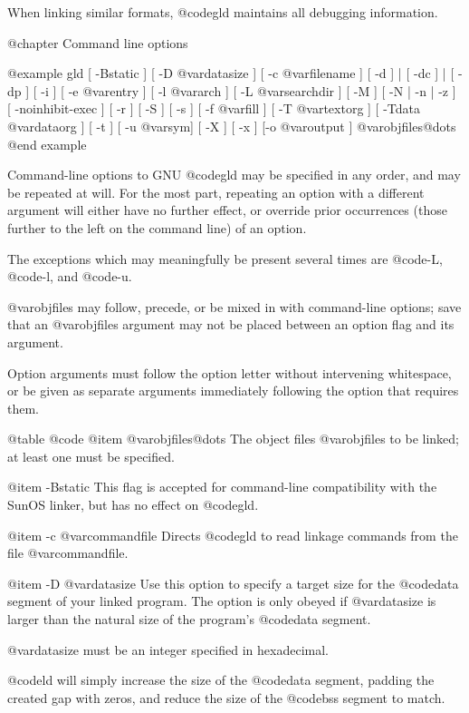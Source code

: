 When linking similar formats, @code{gld} maintains all debugging
information. 

@chapter Command line options

@example
  gld [ -Bstatic ]  [ -D @var{datasize} ] 
      [ -c @var{filename} ]
      [ -d ]  | [ -dc ] | [ -dp ]
      [ -i ]
      [ -e @var{entry} ]  [ -l @var{arch} ]  [ -L @var{searchdir} ]  [ -M ]  
      [ -N | -n | -z ]  [ -noinhibit-exec ]  [ -r ]  [ -S ]  [ -s ]  
      [ -f @var{fill} ]
      [ -T @var{textorg} ]  [ -Tdata @var{dataorg} ]  [ -t ]  [ -u @var{sym}]
      [ -X ]  [ -x ] 
      [-o @var{output} ] @var{objfiles}@dots{}
@end example

Command-line options to GNU @code{gld} may be specified in any order, and
may be repeated at will.  For the most part, repeating an option with a
different argument will either have no further effect, or override prior
occurrences (those further to the left on the command line) of an
option.  

The exceptions which may meaningfully be present several times
are @code{-L}, @code{-l}, and @code{-u}.

@var{objfiles} may follow, precede, or be mixed in with
command-line options; save that an @var{objfiles} argument may not be
placed between an option flag and its argument.

Option arguments must follow the option letter without intervening
whitespace, or be given as separate arguments immediately following the
option that requires them.

@table @code
@item @var{objfiles}@dots{}
The object files @var{objfiles} to be linked; at least one must be specified.

@item -Bstatic 
This flag is accepted for command-line compatibility with the SunOS linker,
but has no effect on @code{gld}.

@item -c @var{commandfile}
Directs @code{gld} to read linkage commands from the file @var{commandfile}.

@item -D @var{datasize}
Use this option to specify a target size for the @code{data} segment of
your linked program.  The option is only obeyed if @var{datasize} is
larger than the natural size of the program's @code{data} segment.

@var{datasize} must be an integer specified in hexadecimal.

@code{ld} will simply increase the size of the @code{data} segment,
padding the created gap with zeros, and reduce the size of the
@code{bss} segment to match.

